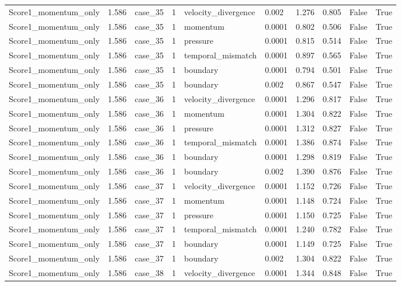 \begin{longtable}{llllllllll}
Score1\_momentum\_only & 1.586 & case\_35 & 1 & velocity\_divergence & 0.002 & 1.276 & 0.805 & False & True \\
Score1\_momentum\_only & 1.586 & case\_35 & 1 & momentum & 0.0001 & 0.802 & 0.506 & False & True \\
Score1\_momentum\_only & 1.586 & case\_35 & 1 & pressure & 0.0001 & 0.815 & 0.514 & False & True \\
Score1\_momentum\_only & 1.586 & case\_35 & 1 & temporal\_mismatch & 0.0001 & 0.897 & 0.565 & False & True \\
Score1\_momentum\_only & 1.586 & case\_35 & 1 & boundary & 0.0001 & 0.794 & 0.501 & False & True \\
Score1\_momentum\_only & 1.586 & case\_35 & 1 & boundary & 0.002 & 0.867 & 0.547 & False & True \\
Score1\_momentum\_only & 1.586 & case\_36 & 1 & velocity\_divergence & 0.0001 & 1.296 & 0.817 & False & True \\
Score1\_momentum\_only & 1.586 & case\_36 & 1 & momentum & 0.0001 & 1.304 & 0.822 & False & True \\
Score1\_momentum\_only & 1.586 & case\_36 & 1 & pressure & 0.0001 & 1.312 & 0.827 & False & True \\
Score1\_momentum\_only & 1.586 & case\_36 & 1 & temporal\_mismatch & 0.0001 & 1.386 & 0.874 & False & True \\
Score1\_momentum\_only & 1.586 & case\_36 & 1 & boundary & 0.0001 & 1.298 & 0.819 & False & True \\
Score1\_momentum\_only & 1.586 & case\_36 & 1 & boundary & 0.002 & 1.390 & 0.876 & False & True \\
Score1\_momentum\_only & 1.586 & case\_37 & 1 & velocity\_divergence & 0.0001 & 1.152 & 0.726 & False & True \\
Score1\_momentum\_only & 1.586 & case\_37 & 1 & momentum & 0.0001 & 1.148 & 0.724 & False & True \\
Score1\_momentum\_only & 1.586 & case\_37 & 1 & pressure & 0.0001 & 1.150 & 0.725 & False & True \\
Score1\_momentum\_only & 1.586 & case\_37 & 1 & temporal\_mismatch & 0.0001 & 1.240 & 0.782 & False & True \\
Score1\_momentum\_only & 1.586 & case\_37 & 1 & boundary & 0.0001 & 1.149 & 0.725 & False & True \\
Score1\_momentum\_only & 1.586 & case\_37 & 1 & boundary & 0.002 & 1.304 & 0.822 & False & True \\
Score1\_momentum\_only & 1.586 & case\_38 & 1 & velocity\_divergence & 0.0001 & 1.344 & 0.848 & False & True \\

\end{longtable}
